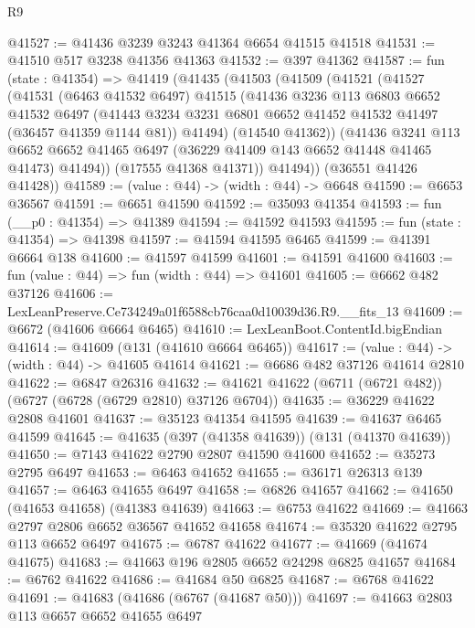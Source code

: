 \begin{lexlean}{R9}
\begin{coremodule}
@41527 := @41436 @3239 @3243 @41364 @6654 @41515 @41518
@41531 := @41510 @517 @3238 @41356 @41363
@41532 := @397 @41362
@41587 := fun (state : @41354) =>
  @41419
    (@41435
      (@41503
        (@41509
          (@41521
            (@41527
              (@41531
                (@6463 @41532 @6497)
                @41515
                (@41436
                  @3236
                  @113
                  @6803
                  @6652
                  @41532
                  @6497
                  (@41443 @3234 @3231 @6801 @6652 @41452 @41532 @41497 (@36457 @41359 @1144 @81))
                  @41494)
                (@14540 @41362))
              (@41436
                @3241
                @113
                @6652
                @6652
                @41465
                @6497
                (@36229 @41409 @143 @6652 @41448 @41465 @41473)
                @41494))
            (@17555 @41368 @41371))
          @41494))
      (@36551 @41426 @41428))
@41589 := (value : @44) -> (width : @44) -> @6648
@41590 := @6653 @36567
@41591 := @6651 @41590
@41592 := @35093 @41354
@41593 := fun (__p0 : @41354) => @41389
@41594 := @41592 @41593
@41595 := fun (state : @41354) => @41398
@41597 := @41594 @41595 @6465
@41599 := @41391 @6664 @138
@41600 := @41597 @41599
@41601 := @41591 @41600
@41603 := fun (value : @44) => fun (width : @44) => @41601
@41605 := @6662 @482 @37126
@41606 := LexLeanPreserve.Ce734249a01f6588cb76caa0d10039d36.R9.__fits_13
@41609 := @6672 (@41606 @6664 @6465)
@41610 := LexLeanBoot.ContentId.bigEndian
@41614 := @41609 (@131 (@41610 @6664 @6465))
@41617 := (value : @44) -> (width : @44) -> @41605 @41614
@41621 := @6686 @482 @37126 @41614 @2810
@41622 := @6847 @26316
@41632 := @41621 @41622 (@6711 (@6721 @482)) (@6727 (@6728 (@6729 @2810) @37126 @6704))
@41635 := @36229 @41622 @2808 @41601
@41637 := @35123 @41354 @41595
@41639 := @41637 @6465 @41599
@41645 := @41635 (@397 (@41358 @41639)) (@131 (@41370 @41639))
@41650 := @7143 @41622 @2790 @2807 @41590 @41600
@41652 := @35273 @2795 @6497
@41653 := @6463 @41652
@41655 := @36171 @26313 @139
@41657 := @6463 @41655 @6497
@41658 := @6826 @41657
@41662 := @41650 (@41653 @41658) (@41383 @41639)
@41663 := @6753 @41622
@41669 := @41663 @2797 @2806 @6652 @36567 @41652 @41658
@41674 := @35320 @41622 @2795 @113 @6652 @6497
@41675 := @6787 @41622
@41677 := @41669 (@41674 @41675)
@41683 := @41663 @196 @2805 @6652 @24298 @6825 @41657
@41684 := @6762 @41622
@41686 := @41684 @50 @6825
@41687 := @6768 @41622
@41691 := @41683 (@41686 (@6767 (@41687 @50)))
@41697 := @41663 @2803 @113 @6657 @6652 @41655 @6497

\end{coremodule}
\end{lexlean}
